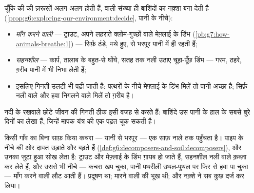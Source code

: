 \begin{proposition}[ऑक्सीजन नक़्शा खींचती है]\label{prop:g7:oxygen-in-the-water:map}
चूँकि  की  की ज़रूरतें अलग-अलग होती हैं,  वाली
संख्या ही बाशिंदों का नक़्शा बना देती है
(\cref{prop:g6:exploring-our-environment:decide}, पानी के नीचे):
\begin{itemize}
  \item \emph{माँग करने वाली}  --- ट्राउट, अपने लहराते
        क्लोम-गुच्छों वाले मेफ़्लाई के डिंभ
        (\cref{pb:g7:how-animals-breathe:1}) --- सिर्फ़ ठंडे, मथे हुए,
         से भरपूर पानी में ही रहती हैं;
  \item \emph{सहनशील}  --- कार्प, तालाब के बहुत-से घोंघे,
        सतह तक नली उठाए चूहा-पूँछ डिंभ --- गरम, ठहरे, ग़रीब पानी में भी
        निभा लेती हैं;
  \item इसलिए गिनती उलटी भी पढ़ी जाती है: पत्थरों के नीचे मेफ़्लाई के
        डिंभ मिलें तो पानी अच्छा है; सिर्फ़ नली वाले और हवा निगलने वाले
        मिलें तो ग़रीब है।
\end{itemize}
नदी के रखवाले छोटे जीवन की गिनती ठीक इसी वजह से करते हैं: बाशिंदे उस
पानी के हाल के सबसे बुरे दिनों का लेखा हैं, जिन्हें मापक यंत्र की एक
पढ़त चूक सकती है।
\end{proposition}
\admitted

\begin{example}[कार्बनिक कचरे की कहानी]\label{ex:g7:oxygen-in-the-water:waste}
किसी गाँव का बिना साफ़ किया कचरा --- यानी  से भरपूर ---
एक साफ़ नाले तक पहुँचता है। पाइप के नीचे की ओर  दावत उड़ाते और
बढ़ते हैं (\cref{def:g6:decomposers-and-soil:decomposers}), और उनका
जुटा हुआ   सोख लेता है: ट्राउट और मेफ़्लाई के डिंभ ग़ायब हो
जाते हैं, सहनशील नली वाले क़ब्ज़ा कर लेते हैं, और उससे भी नीचे --- कचरा
खप चुका, पानी पथरीली उथल-पुथल पर फिर से हवा पा चुका --- माँग करने वाली
 लौट आती हैं। प्रदूषण  था; मारने वाली 
की भूख थी; और नक़्शे ने सब कुछ दर्ज कर लिया।
\end{example}


